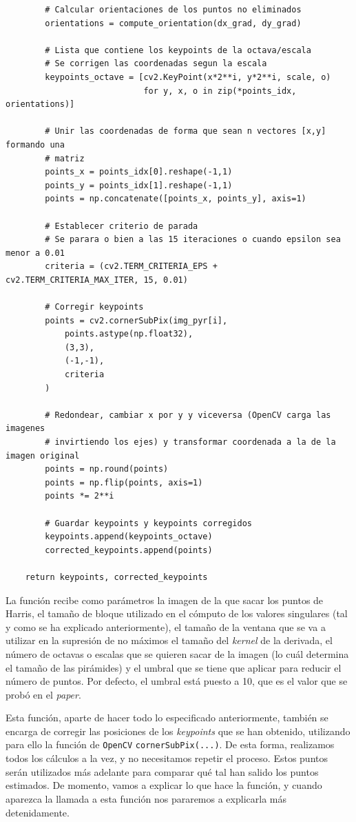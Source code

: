 \documentclass[11pt,a4paper]{article}
\begin{document}
\begin{lstlisting}
        # Calcular orientaciones de los puntos no eliminados
        orientations = compute_orientation(dx_grad, dy_grad)

        # Lista que contiene los keypoints de la octava/escala
        # Se corrigen las coordenadas segun la escala
        keypoints_octave = [cv2.KeyPoint(x*2**i, y*2**i, scale, o)
                            for y, x, o in zip(*points_idx, orientations)]

        # Unir las coordenadas de forma que sean n vectores [x,y] formando una  
        # matriz
        points_x = points_idx[0].reshape(-1,1)
        points_y = points_idx[1].reshape(-1,1)
        points = np.concatenate([points_x, points_y], axis=1)

        # Establecer criterio de parada
        # Se parara o bien a las 15 iteraciones o cuando epsilon sea menor a 0.01
        criteria = (cv2.TERM_CRITERIA_EPS + cv2.TERM_CRITERIA_MAX_ITER, 15, 0.01)

        # Corregir keypoints
        points = cv2.cornerSubPix(img_pyr[i],
            points.astype(np.float32),
            (3,3),
            (-1,-1),
            criteria
        )

        # Redondear, cambiar x por y y viceversa (OpenCV carga las imagenes
        # invirtiendo los ejes) y transformar coordenada a la de la imagen original
        points = np.round(points)
        points = np.flip(points, axis=1)
        points *= 2**i

        # Guardar keypoints y keypoints corregidos
        keypoints.append(keypoints_octave)
        corrected_keypoints.append(points)

    return keypoints, corrected_keypoints
\end{lstlisting}

La función recibe como parámetros la imagen de la que sacar los puntos de Harris,
el tamaño de bloque utilizado en el cómputo de los valores singulares (tal y como
se ha explicado anteriormente), el tamaño de la ventana que se va a utilizar en la supresión
de no máximos el tamaño del \textit{kernel} de la derivada, el número de octavas o escalas
que se quieren sacar de la imagen (lo cuál determina el tamaño de las pirámides) y el
umbral que se tiene que aplicar para reducir el número de puntos. Por defecto, el
umbral está puesto a 10, que es el valor que se probó en el \textit{paper}.

Esta función, aparte de hacer todo lo especificado anteriormente, también se encarga
de corregir las posiciones de los \textit{keypoints} que se han obtenido, utilizando
para ello la función de \texttt{OpenCV} \texttt{cornerSubPix(...)}. De esta forma, realizamos
todos los cálculos a la vez, y no necesitamos repetir el proceso. Estos puntos serán utilizados
más adelante para comparar qué tal han salido los puntos estimados. De momento, vamos
a explicar lo que hace la función, y cuando aparezca la llamada a esta función nos
pararemos a explicarla más detenidamente.
\end{document}
